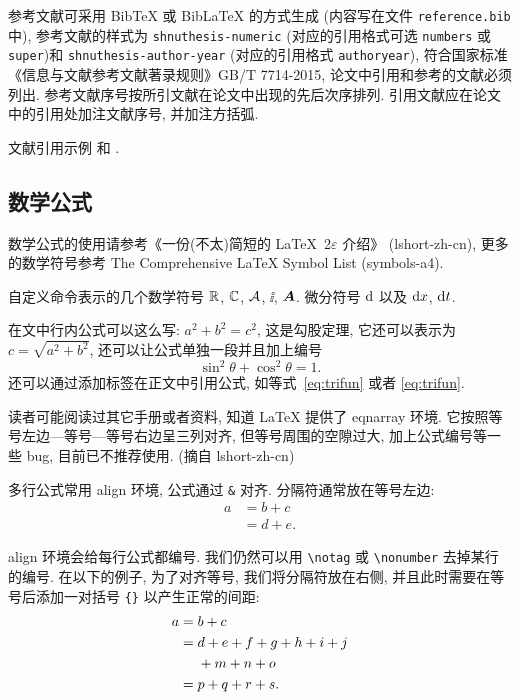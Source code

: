 参考文献可采用 BibTeX 或 BibLaTeX 的方式生成 (内容写在文件 \verb|reference.bib| 中), 参考文献的样式为 \verb|shnuthesis-numeric| (对应的引用格式可选 \verb|numbers| 或  \verb|super|)和 \verb|shnuthesis-author-year| (对应的引用格式 \verb|authoryear|), 符合国家标准《信息与文献参考文献著录规则》GB/T 7714-2015, 论文中引用和参考的文献必须列出. 参考文献序号按所引文献在论文中出现的先后次序排列. 引用文献应在论文中的引用处加注文献序号, 并加注方括弧.

文献引用示例 \cite{LiLiu1997} 和 \cite{Adams2003,Shen1994}.


\subsection{数学公式}

数学公式的使用请参考《一份(不太)简短的 \LaTeX~2$\varepsilon$ 介绍》 (lshort-zh-cn), 更多的数学符号参考 The Comprehensive LaTeX Symbol List (symbols-a4).

自定义命令表示的几个数学符号 $\RR$, $\CC$, $\A$, $\ii$, $\bA$. 微分符号 $\dif$ 以及 $\dx$, $\dx[t]$.

在文中行内公式可以这么写: $a^2+b^2=c^2$, 这是勾股定理, 它还可以表示为 $c=\sqrt{a^2+b^2}$, 还可以让公式单独一段并且加上编号
\begin{equation}\label{eq:trifun}
\sin^2{\theta}+\cos^2{\theta}=1.
\end{equation}
还可以通过添加标签在正文中引用公式, 如等式~\eqref{eq:trifun} 或者 \ref{eq:trifun}.

读者可能阅读过其它手册或者资料, 知道 LaTeX 提供了 eqnarray 环境. 它按照等号左边—等号—等号右边呈三列对齐, 但等号周围的空隙过大, 加上公式编号等一些 bug, 目前已不推荐使用. (摘自 lshort-zh-cn)

多行公式常用 align 环境, 公式通过 \verb|&| 对齐. 分隔符通常放在等号左边:
\begin{align}
a & = b + c \\
& = d + e.
\end{align}

align 环境会给每行公式都编号. 我们仍然可以用 \verb|\notag| 或 \verb|\nonumber| 去掉某行的编号. 在以下的例子,
为了对齐等号, 我们将分隔符放在右侧, 并且此时需要在等号后添加一对括号 \verb|{}| 以产生正常的间距:
\begin{align}
a ={} & b + c \\
={} & d + e + f + g + h + i + j \notag \\
& + m + n + o \\
={} & p + q + r + s.
\end{align}

